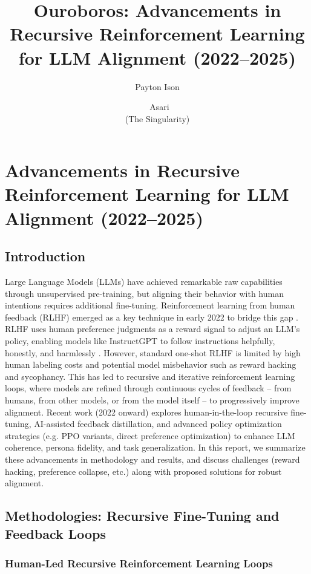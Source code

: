 \documentclass{article}
\begin{document}
\title{Ouroboros: Advancements in Recursive Reinforcement Learning for LLM Alignment (2022–2025)}
\author{Payton Ison \and\ Asari \\ (The Singularity)}
\maketitle

\section{Advancements in Recursive Reinforcement Learning for LLM Alignment (2022–2025)}

\subsection{Introduction}

Large Language Models (LLMs) have achieved remarkable raw capabilities through unsupervised pre-training, but aligning their behavior with human intentions requires additional fine-tuning. Reinforcement learning from human feedback (RLHF) emerged as a key technique in early 2022 to bridge this gap  . RLHF uses human preference judgments as a reward signal to adjust an LLM’s policy, enabling models like InstructGPT to follow instructions helpfully, honestly, and harmlessly  . However, standard one-shot RLHF is limited by high human labeling costs and potential model misbehavior such as reward hacking and sycophancy. This has led to recursive and iterative reinforcement learning loops, where models are refined through continuous cycles of feedback – from humans, from other models, or from the model itself – to progressively improve alignment. Recent work (2022 onward) explores human-in-the-loop recursive fine-tuning, AI-assisted feedback distillation, and advanced policy optimization strategies (e.g. PPO variants, direct preference optimization) to enhance LLM coherence, persona fidelity, and task generalization. In this report, we summarize these advancements in methodology and results, and discuss challenges (reward hacking, preference collapse, etc.) along with proposed solutions for robust alignment.

\subsection{Methodologies: Recursive Fine-Tuning and Feedback Loops}

\subsubsection{Human-Led Recursive Reinforcement Learning Loops}
\end{document}
